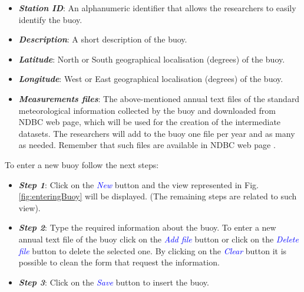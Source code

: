 \begin{onehalfspace}
				\begin{itemize}
					\item \textit{\textbf{Station ID}}: An alphanumeric identifier that allows the researchers to easily identify the buoy.
					\item \textit{\textbf{Description}}: A short description of the buoy.
					\item \textit{\textbf{Latitude}}: North or South geographical localisation (degrees) of the buoy. 
					\item \textit{\textbf{Longitude}}: West or East geographical localisation (degrees) of the buoy.
					\item \textit{\textbf{Measurements files}}: The above-mentioned annual text files of the standard meteorological information collected by the buoy and downloaded from NDBC web page, which will be used for the creation of the intermediate datasets. The researchers will add to the buoy one file per year and as many as needed. Remember that such files are available in NDBC web page \cite{NOAA_1}.
				\end{itemize}
				
				
				To enter a new buoy follow the next steps:
				
					\begin{itemize}\itemsep0.02cm
						\item \textit{\textbf{Step 1}}: Click on the \textcolor{blue}{\textit{New}} button and the view represented in Fig. \ref{fig:enteringBuoy} will be displayed. (The remaining steps are related to such view).
						\item \textit{\textbf{Step 2}}: Type the required information about the buoy. To enter a new annual text file of the buoy click on the \textcolor{blue}{\textit{Add file}} button or click on the \textcolor{blue}{\textit{Delete file}} button to delete the selected one. By clicking on the \textcolor{blue}{\textit{Clear}} button it is possible to clean the form that request the information.
						\item \textit{\textbf{Step 3}}: Click on the \textcolor{blue}{\textit{Save}} button to insert the buoy.
					\end{itemize}
					
				

\end{onehalfspace}
